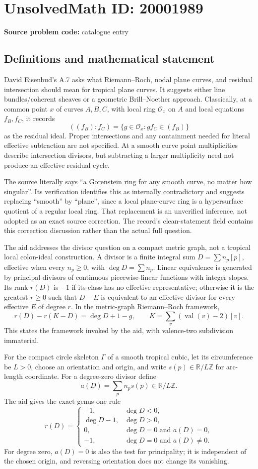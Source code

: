 \documentclass[11pt]{article}
\newcommand{\Z}{\mathbb{Z}}
\newcommand{\R}{\mathbb{R}}
\begin{document}
\section*{UnsolvedMath ID: 20001989}
\textbf{Source problem code:} catalogue entry
\subsection{Definitions and mathematical statement}
David Eisenbud's A.7 asks what Riemann--Roch, nodal plane curves, and residual intersection should mean for tropical plane curves. It suggests either line bundles/coherent sheaves or a geometric Brill--Noether approach. Classically, at a common point \(x\) of curves \(A,B,C\), with local ring \(\mathcal O_x\) on \(A\) and local equations \(f_B,f_C\), it records
\[
 ((f_B):f_C)=\{g\in\mathcal O_x:gf_C\in(f_B)\}
\]
as the residual ideal. Proper intersections and any containment needed for literal effective subtraction are not specified. At a smooth curve point multiplicities describe intersection divisors, but subtracting a larger multiplicity need not produce an effective residual cycle.

The source literally says ``a Gorenstein ring for any smooth curve, no matter how singular''. Its verification identifies this as internally contradictory and suggests replacing ``smooth'' by ``plane'', since a local plane-curve ring is a hypersurface quotient of a regular local ring. That replacement is an unverified inference, not adopted as an exact source correction. The record's clean-statement field contains this correction discussion rather than the actual full question.

The aid addresses the divisor question on a compact metric graph, not a tropical local colon-ideal construction. A divisor is a finite integral sum \(D=\sum n_p[p]\), effective when every \(n_p\ge0\), with \(\deg D=\sum n_p\). Linear equivalence is generated by principal divisors of continuous piecewise-linear functions with integer slopes. Its rank \(r(D)\) is \(-1\) if its class has no effective representative; otherwise it is the greatest \(r\ge0\) such that \(D-E\) is equivalent to an effective divisor for every effective \(E\) of degree \(r\). In the metric-graph Riemann--Roch framework,
\[
 r(D)-r(K-D)=\deg D+1-g,
 \qquad K=\sum_v(\operatorname{val}(v)-2)[v].
\]
This states the framework invoked by the aid, with valence-two subdivision immaterial.

For the compact circle skeleton \(\Gamma\) of a smooth tropical cubic, let its circumference be \(L>0\), choose an orientation and origin, and write \(s(p)\in\R/L\Z\) for arc-length coordinate. For a degree-zero divisor define
\[
 a(D)=\sum_p n_p s(p)\in\R/L\Z.
\]
The aid gives the exact genus-one rule
\[
 r(D)=
 \begin{cases}
 -1,&\deg D<0,\\
 \deg D-1,&\deg D>0,\\
 0,&\deg D=0\text{ and }a(D)=0,\\
 -1,&\deg D=0\text{ and }a(D)\ne0.
 \end{cases}
\]
For degree zero, \(a(D)=0\) is also the test for principality; it is independent of the chosen origin, and reversing orientation does not change its vanishing.
\end{document}
